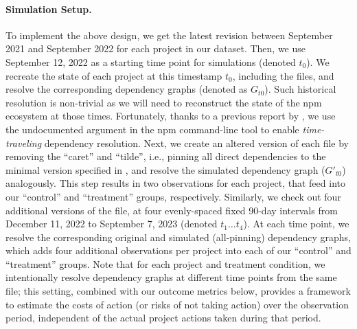 \paragraph{Simulation Setup.}
To implement the above design, we get the latest revision between September 2021 and September 2022 for each project in our dataset.
Then, we use September 12, 2022 as a starting time point for simulations (denoted $t_0$). 
We recreate the state of each project at this timestamp $t_0$, including the  files, and resolve the corresponding dependency graphs (denoted as $G_{t0}$). 
Such historical resolution is non-trivial as we will need to reconstruct the state of the npm ecosystem at those times. 
Fortunately, thanks to a previous report by \citet{DBLP:conf/msr/PinckneyCGB23}, we use the undocumented  argument in the npm command-line tool to enable \textit{time-traveling} dependency resolution.
Next, we create an altered version of each  file by removing the ``caret'' and ``tilde'', i.e., pinning all direct dependencies to the minimal version specified in , and resolve the simulated dependency graph ($G'_{t0}$) analogously. 
This step results in two observations for each project, that feed into our ``control'' and ``treatment'' groups, respectively.
Similarly, we check out four additional versions of the  file, at four evenly-spaced fixed 90-day intervals from December 11, 2022 to September 7, 2023 (denoted $t_1 \ldots t_4$). At each time point, we resolve the corresponding original and simulated (all-pinning) dependency graphs, which adds four additional observations per project into each of our ``control''  and ``treatment'' groups.
Note that for each project and treatment condition, we intentionally resolve dependency graphs at different time points from the same  file; this setting, combined with our outcome metrics below, provides a framework to estimate the costs of action (or risks of not taking action) over the observation period, independent of the actual project actions taken during that period.

